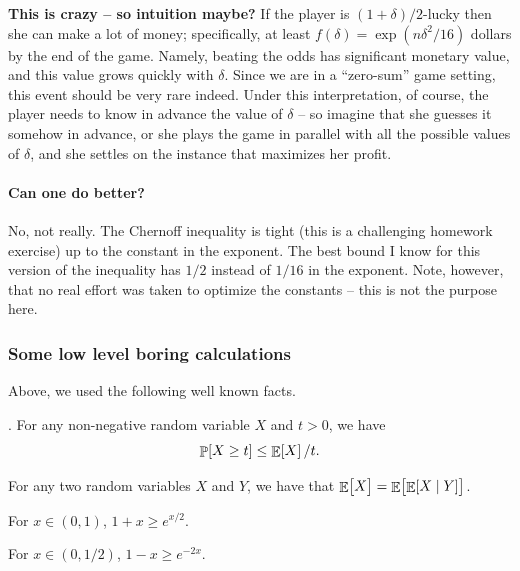 \medskip%
\noindent%
\textbf{This is crazy -- so intuition maybe?} %
If the player is $(1+\delta)/2$-lucky then she can make a lot of money;
specifically, at least $f(\delta)=\exp(n \delta^2 / 16)$ dollars by the end of the
game.  Namely, beating the odds has significant monetary value, and this
value grows quickly with $\delta$. Since we are in a ``zero-sum'' game
setting, this event should be very rare indeed. Under this
interpretation, of course, the player needs to know in advance the value
of $\delta$ -- so imagine that she guesses it somehow in advance, or she plays
the game in parallel with all the possible values of $\delta$, and she settles
on the instance that maximizes her profit.

\paragraph*{Can one do better?}
No, not really. The Chernoff inequality is tight (this is a challenging
homework exercise) up to the constant in the exponent. The best bound
I know for this version of the inequality has $1/2$ instead of $1/16$
in the exponent. Note, however, that no real effort was taken to
optimize the constants -- this is not the purpose here.



\subsubsection{Some low level boring calculations}

Above, we used the following well known facts.
\begin{lemma}
    \begin{compactenumA}[label=(\Alph*)]
        \item {}. For any non-negative random variable
        $X$ and $t > 0$, we have
        \begin{equation*}
            \Prob{X \geq t} \leq \Ex{X}/t.
        \end{equation*}

        \item For any two random variables $X$ and $Y$, we have that
        $\mathop{\mathbb{E}}\!\left[ {\bigl. X} \right] = \mathop{\mathbb{E}}\!\left[ {  \mathop{\mathbb{E}}\!\left[ { X \mid  Y } \right]\bigr.} \right]$.
        \item For $x \in (0,1)$, $1+x \geq e^{x/2}$.

        \item For $x \in (0,1/2)$, $1-x \geq e^{-2x}$.
    \end{compactenumA}
\end{lemma}

